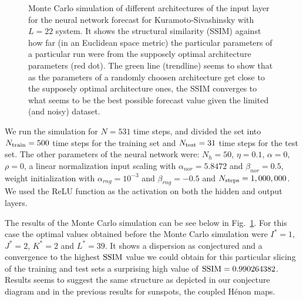\documentclass[journal]{IEEEtran}
\begin{document}
\begin{figure}[!ht]
\centering
{}
\caption{Monte Carlo simulation of different architectures of the input layer for the neural network forecast for
Kuramoto-Sivashinsky with $L=22$ system.
It shows the structural similarity (SSIM) against how far (in an Euclidean space metric) the particular parameters of a particular
run were from the supposely optimal architecture parameters (red dot). The green line (trendline) seems to show that as the parameters
of a randomly choosen architecture get close to the supposely optimal architecture ones, the SSIM converges to what seems to be the
best possible forecast value given the limited (and noisy) dataset.}
\label{MonteCarloSSIMversusParameterMetricDistanceKS_L=22}
\end{figure}

We run the simulation for $N=531$ time steps, and divided the set into $N_{\textnormal{train}}=500$ time steps for the training set
and $N_{\textnormal{test}}=31$ time steps for the test set. The other parameters of the neural network were:
$N_h=50$, $\eta=0.1$, $\alpha=0$, $\rho=0$, a linear normalization input scaling with 
$\alpha_{nor} = 5.8472$ and $\beta_{nor} =0.5$, weight initialization 
with $\alpha_{rng} = 10^{-3}$ and $\beta_{rng} = -0.5$ and $N_{\textnormal{steps}}=1,000,000$. 
We used the ReLU function as the activation on both the hidden and output layers.

The results of the Monte Carlo simulation can be see below in Fig.\ \ref{MonteCarloSSIMversusParameterMetricDistanceKS_L=22}.
For this case the optimal values obtained before the Monte Carlo simulation were $I^*=1$, $J^*=2$, $K^*=2$ and $L^*=39$. It shows a dispersion as conjectured and a convergence to the highest $\textnormal{SSIM}$ value we could obtain for this particular slicing of the training and test sets a surprising high value of $\textnormal{SSIM}=0.990264382$. Results seems to suggest the same structure as depicted in our conjecture diagram and in the previous results for sunspots, the coupled H\'{e}non maps.
\end{document}
